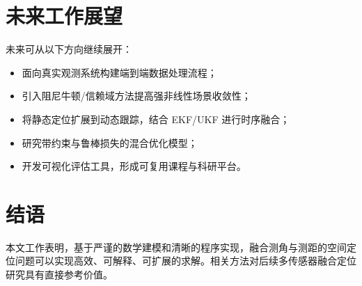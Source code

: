 \section{未来工作展望}
未来可从以下方向继续展开：
\begin{itemize}
  \item 面向真实观测系统构建端到端数据处理流程；
  \item 引入阻尼牛顿/信赖域方法提高强非线性场景收敛性；
  \item 将静态定位扩展到动态跟踪，结合 EKF/UKF 进行时序融合；
  \item 研究带约束与鲁棒损失的混合优化模型；
  \item 开发可视化评估工具，形成可复用课程与科研平台。
\end{itemize}

\section{结语}
本文工作表明，基于严谨的数学建模和清晰的程序实现，融合测角与测距的空间定位问题可以实现高效、可解释、可扩展的求解。相关方法对后续多传感器融合定位研究具有直接参考价值。
